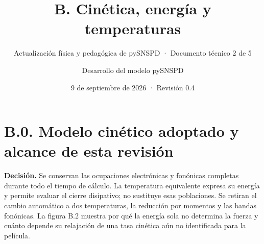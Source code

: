 \documentclass[
  spanish,
  10pt,
  a4paper,
]{article}
\title{B. Cinética, energía y temperaturas}
\subtitle{Actualización física y pedagógica de pySNSPD · Documento
técnico 2 de 5}
\author{Desarrollo del modelo pySNSPD}
\date{9 de septiembre de 2026 · Revisión 0.4}
\begin{document}
\maketitle

{
\setcounter{tocdepth}{2}
\tableofcontents
}
\newpage

\section{B.0. Modelo cinético adoptado y alcance de esta
revisión}\label{b.0.-modelo-cinuxe9tico-adoptado-y-alcance-de-esta-revisiuxf3n}

\textbf{Decisión.} Se conservan las ocupaciones electrónicas y fonónicas
completas durante todo el tiempo de cálculo. La temperatura equivalente
expresa su energía y permite evaluar el cierre disipativo; no sustituye
esas poblaciones. Se retiran el cambio automático a dos temperaturas, la
reducción por momentos y las bandas fonónicas. La figura B.2 muestra por
qué la energía sola no determina la fuerza y cuánto depende su
relajación de una tasa cinética aún no identificada para la película.
\end{document}
